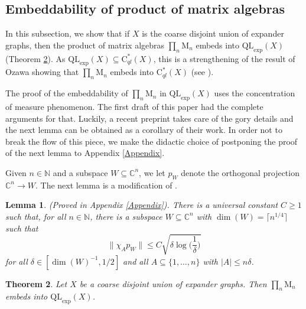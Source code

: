 \documentclass[11pt]{amsart}
\newcommand{\N}{\mathbb{N}}
\newcommand{\C}{\mathbb{C}}
\newcommand{\cstql}{\mathrm{C}^*_{\textit{ql}}}
\numberwithin{equation}{section}
\newtheorem{theorem}{Theorem}[section]
\newtheorem{lemma}[theorem]{Lemma}
\theoremstyle{definition}
\theoremstyle{remark}
\begin{document}
\subsection{Embeddability of product of matrix algebras}
In this subsection, we show that if $X$ is the coarse disjoint union of expander graphs, then the product of matrix algebras $\prod_n\mathrm M_n$ embeds into $\mathrm{QL}_{\exp}(X)$ (Theorem \ref{Thm.Exp.decay.Still.Contains}). As $\mathrm{QL}_{\exp}(X)
\subseteq \cstql(X)$, this is a strengthening of the result of Ozawa showing that  $\prod_n\mathrm M_n$  embeds into $\cstql(X)$ (see \cite[Theorem B]{Ozawa2023}).


The proof of the embeddability of $\prod_n\mathrm M_n$ in $\mathrm{QL}_{\exp}(X)$ uses the   concentration of measure phenomenon. The first draft of this paper had the complete arguments for that. Luckily, a recent preprint \cite{LiZhangZhu2026} takes care of the gory details and the next lemma can be obtained as a corollary of their work.  In order not to break the flow of this piece, we make the didactic choice of postponing the proof of the next lemma to  Appendix \ref{Appendix}. 

Given $n\in\N$ and a subspace $W\subseteq \C^n$, we let $p_W$ denote the orthogonal projection $\C^n\to W$.  The next lemma is a modification of   \cite[Lemma 4]{Ozawa2023}.

\begin{lemma}\emph{(Proved in  Appendix \ref{Appendix})}.  There is a universal constant $C\geq 1$ such that, for all $n\in\N$, there is a   subspace $W\subseteq\C^n$ with $\dim(W)=\lceil n^{1/4}\rceil$ such that
\[
\|\chi_Ap_W\|\leq C\sqrt{\delta\log\Big(\frac1\delta\Big)}
\]
for all $\delta\in[\dim(W)^{-1},1/2]$ and all $A\subseteq\{1,\dots,n\}$ with $|A|\leq n\delta$.\label{LemmaGoodSubspacesQuarterPower}
\end{lemma}

\begin{theorem}\label{Thm.Exp.decay.Still.Contains}
    Let $X$ be a coarse disjoint union of expander graphs. Then $\prod_n\mathrm M_n$ embeds into $\mathrm{QL}_{\exp}(X)$.
\end{theorem}
\end{document}
